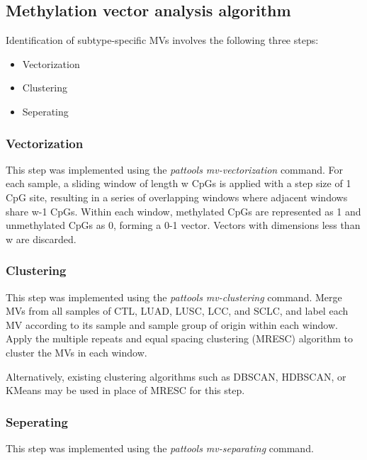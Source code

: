 \documentclass[12pt,letterpaper]{article}
\begin{document}
\subsection{Methylation vector analysis algorithm}\label{sec:ssmv}

Identification of subtype-specific MVs involves the following three steps:

\begin{itemize}
    \item  Vectorization
    \item  Clustering
    \item  Seperating
\end{itemize}

\subsubsection{Vectorization}

This step was implemented using the \textit{pattools mv-vectorization} command. For each sample, 
a sliding window of length w CpGs is applied with a step size of 1 CpG site, resulting in a series 
of overlapping windows where adjacent windows share w-1 CpGs. Within each window, methylated CpGs 
are represented as 1 and unmethylated CpGs as 0, forming a 0-1 vector. Vectors with dimensions less 
than w are discarded.

\subsubsection{Clustering}

This step was implemented using the \textit{pattools mv-clustering} command. Merge MVs from all 
samples of CTL, LUAD, LUSC, LCC, and SCLC, and label each MV according to its sample and sample 
group of origin within each window. Apply the multiple repeats and equal spacing clustering (MRESC) 
algorithm to cluster the MVs in each window. 

Alternatively, existing clustering algorithms such as 
DBSCAN\cite{dbscanschubert}, HDBSCAN\cite{mcinnes2017hdbscan}, or KMeans\cite{kmeanskrishna} 
may be used in place of MRESC for this step.

\subsubsection{Seperating}

This step was implemented using the \textit{pattools mv-separating} command.
\end{document}
